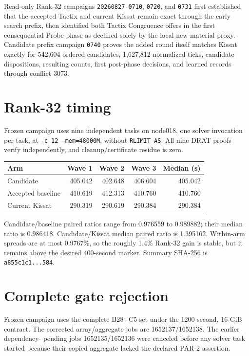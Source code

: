 \documentclass[11pt]{article}
\newcommand{\code}[1]{\texttt{#1}}
\begin{document}
Read-only Rank-32 campaigns \code{20260827-0710}, \code{0720}, and
\code{0731} first established that the accepted Tactix and current Kissat
remain exact through the early search prefix, then identified both Tactix
Congruence offers in the first consequential Probe phase as declined solely by
the local new-material proxy.  Candidate prefix campaign \code{0740} proves
the added round itself matches Kissat exactly for 542,604 ordered candidates,
1,627,812 normalized ticks, candidate dispositions, resulting counts, first
post-phase decisions, and learned records through conflict 3073.

\section{Rank-32 timing}

Frozen campaign
uses nine independent tasks on node018, one solver invocation per task, at
\code{-c 12 --mem=48000M}, without \code{RLIMIT\_AS}.  All nine DRAT proofs
verify independently, and cleanup/certificate residue is zero.

\begin{center}
\begin{tabular}{@{}lrrrr@{}}
\toprule
Arm & Wave 1 & Wave 2 & Wave 3 & Median (s) \\
\midrule
Candidate & 405.042 & 402.648 & 406.604 & 405.042 \\
Accepted baseline & 410.619 & 412.313 & 410.760 & 410.760 \\
Current Kissat & 290.319 & 290.619 & 290.384 & 290.384 \\
\bottomrule
\end{tabular}
\end{center}

Candidate/baseline paired ratios range from 0.976559 to 0.989882; their
median ratio is 0.986418.  Candidate/Kissat median paired ratio is 1.395162.
Within-arm spreads are at most 0.9767\%, so the roughly 1.4\% Rank-32 gain is
stable, but it remains above the desired 400-second marker.  Summary SHA-256
is \code{a855c1c1...584}.

\section{Complete gate rejection}

Frozen campaign
uses the complete B28+C5 set under the 1200-second, 16-GiB contract.  The
corrected array/aggregate jobs are 1652137/1652138.  The earlier dependency-
pending jobs 1652135/1652136 were canceled before any solver task started
because their copied aggregate lacked the declared PAR-2 assertion.
\end{document}
